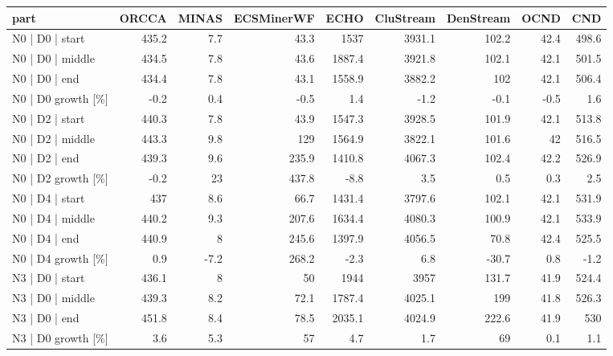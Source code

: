 \begin{tabular}{lrrrrrrrr}
\hline
 part               &   ORCCA &   MINAS &   ECSMinerWF &   ECHO &   CluStream &   DenStream &   OCND &   CND \\
\hline
 N0 | D0 | start    &   435.2 &     7.7 &         43.3 & 1537   &      3931.1 &       102.2 &   42.4 & 498.6 \\
 N0 | D0 | middle   &   434.5 &     7.8 &         43.6 & 1887.4 &      3921.8 &       102.1 &   42.1 & 501.5 \\
 N0 | D0 | end      &   434.4 &     7.8 &         43.1 & 1558.9 &      3882.2 &       102   &   42.1 & 506.4 \\
 N0 | D0 growth [\%] &    -0.2 &     0.4 &         -0.5 &    1.4 &        -1.2 &        -0.1 &   -0.5 &   1.6 \\
 N0 | D2 | start    &   440.3 &     7.8 &         43.9 & 1547.3 &      3928.5 &       101.9 &   42.1 & 513.8 \\
 N0 | D2 | middle   &   443.3 &     9.8 &        129   & 1564.9 &      3822.1 &       101.6 &   42   & 516.5 \\
 N0 | D2 | end      &   439.3 &     9.6 &        235.9 & 1410.8 &      4067.3 &       102.4 &   42.2 & 526.9 \\
 N0 | D2 growth [\%] &    -0.2 &    23   &        437.8 &   -8.8 &         3.5 &         0.5 &    0.3 &   2.5 \\
 N0 | D4 | start    &   437   &     8.6 &         66.7 & 1431.4 &      3797.6 &       102.1 &   42.1 & 531.9 \\
 N0 | D4 | middle   &   440.2 &     9.3 &        207.6 & 1634.4 &      4080.3 &       100.9 &   42.1 & 533.9 \\
 N0 | D4 | end      &   440.9 &     8   &        245.6 & 1397.9 &      4056.5 &        70.8 &   42.4 & 525.5 \\
 N0 | D4 growth [\%] &     0.9 &    -7.2 &        268.2 &   -2.3 &         6.8 &       -30.7 &    0.8 &  -1.2 \\
 N3 | D0 | start    &   436.1 &     8   &         50   & 1944   &      3957   &       131.7 &   41.9 & 524.4 \\
 N3 | D0 | middle   &   439.3 &     8.2 &         72.1 & 1787.4 &      4025.1 &       199   &   41.8 & 526.3 \\
 N3 | D0 | end      &   451.8 &     8.4 &         78.5 & 2035.1 &      4024.9 &       222.6 &   41.9 & 530   \\
 N3 | D0 growth [\%] &     3.6 &     5.3 &         57   &    4.7 &         1.7 &        69   &    0.1 &   1.1 \\

\end{tabular}
